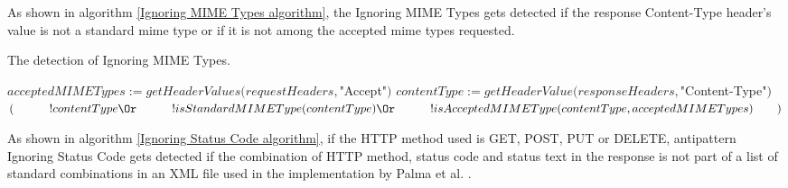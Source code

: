 As shown in algorithm \ref{Ignoring MIME Types algorithm}, the Ignoring MIME Types gets detected if the response Content-Type header's value is not a standard mime type or if it is not among the accepted mime types requested.

\begin{algorithm}
\caption{The detection of Ignoring MIME Types.}
\begin{algorithmic}
\State $acceptedMIMETypes := getHeaderValues(requestHeaders, $"Accept"$)$
\State $contentType := getHeaderValue(responseHeaders, $"Content-Type"$)$
\State \Return $( \newline
\hspace*{3em} !contentType \Or \newline
\hspace*{3em} !isStandardMIMEType(contentType) \Or \newline
\hspace*{3em} !isAcceptedMIMEType(contentType, acceptedMIMETypes) \newline
\hspace*{2em})$
\EndFunction
\end{algorithmic}
\label{Ignoring MIME Types algorithm}
\end{algorithm}

As shown in algorithm \ref{Ignoring Status Code algorithm}, if the HTTP method used is GET, POST, PUT or DELETE, antipattern Ignoring Status Code gets detected if the combination of HTTP method, status code and status text in the response is not part of a list of standard combinations in an XML file used in the implementation by Palma et al.  \cite{linguistic}.

